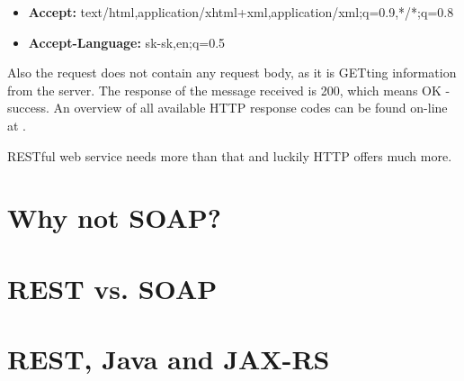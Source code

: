 	\begin{itemize}
	  \item \textbf{Accept:} text/html,application/xhtml+xml,application/xml;q=0.9,*/*;q=0.8
	  \item \textbf{Accept-Language:} sk-sk,en;q=0.5
	\end{itemize}
	
	Also the request does not contain any request body, as it is GETting information from the server. The response of the
	message received is 200, which means OK - success. An overview of all available HTTP response codes can be found
	on-line at \cite{httpcodes}.
	
	RESTful web service needs more than that and luckily \gls{HTTP} offers much more.
	
	\section{Why not SOAP?}
	
	\section{REST vs. SOAP}
	
	\section{REST, Java and JAX-RS}